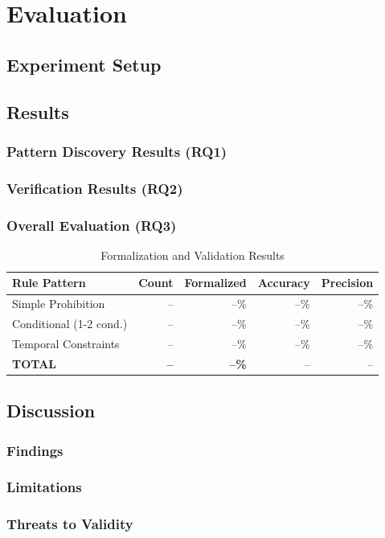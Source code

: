 \chapter{Evaluation}

\section{Experiment Setup}

\section{Results}

\subsection{Pattern Discovery Results (RQ1)}

\subsection{Verification Results (RQ2)}

\subsection{Overall Evaluation (RQ3)}
\begin{table}[h]
\centering
\caption{Formalization and Validation Results}
\begin{tabular}{lrrrr}
\toprule
Rule Pattern & Count & Formalized & Accuracy & Precision \\
\midrule
Simple Prohibition & -- & --\% & --\% & --\% \\
Conditional (1-2 cond.) & -- & --\% & --\% & --\% \\
Temporal Constraints & -- & --\% & --\% & --\% \\
\textbf{TOTAL} & \textbf{--} & \textbf{--\%} & -- & -- \\
\bottomrule
\end{tabular}
\end{table}

\section{Discussion}
\subsection{Findings}
\subsection{Limitations}
\subsection{Threats to Validity}
